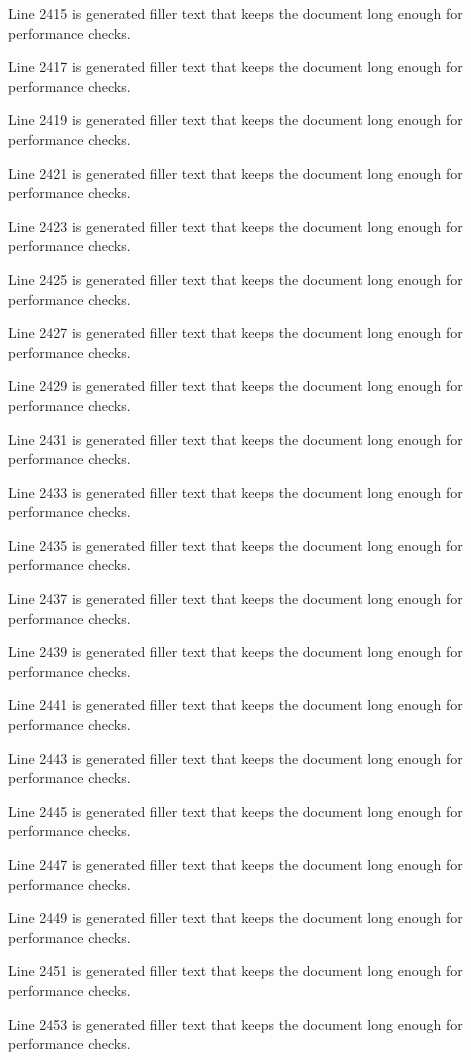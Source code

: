 Line 2415 is generated filler text that keeps the document long enough for performance checks.

Line 2417 is generated filler text that keeps the document long enough for performance checks.

Line 2419 is generated filler text that keeps the document long enough for performance checks.

Line 2421 is generated filler text that keeps the document long enough for performance checks.

Line 2423 is generated filler text that keeps the document long enough for performance checks.

Line 2425 is generated filler text that keeps the document long enough for performance checks.

Line 2427 is generated filler text that keeps the document long enough for performance checks.

Line 2429 is generated filler text that keeps the document long enough for performance checks.

Line 2431 is generated filler text that keeps the document long enough for performance checks.

Line 2433 is generated filler text that keeps the document long enough for performance checks.

Line 2435 is generated filler text that keeps the document long enough for performance checks.

Line 2437 is generated filler text that keeps the document long enough for performance checks.

Line 2439 is generated filler text that keeps the document long enough for performance checks.

Line 2441 is generated filler text that keeps the document long enough for performance checks.

Line 2443 is generated filler text that keeps the document long enough for performance checks.

Line 2445 is generated filler text that keeps the document long enough for performance checks.

Line 2447 is generated filler text that keeps the document long enough for performance checks.

Line 2449 is generated filler text that keeps the document long enough for performance checks.

Line 2451 is generated filler text that keeps the document long enough for performance checks.

Line 2453 is generated filler text that keeps the document long enough for performance checks.


